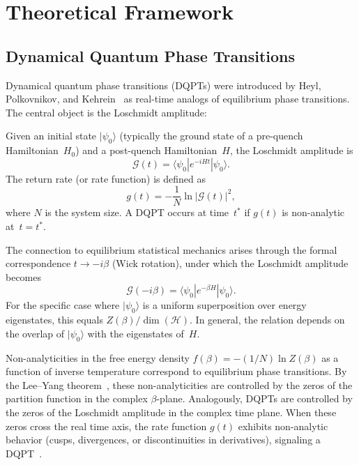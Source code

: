\section{Theoretical Framework}
\label{sec:theory}

\subsection{Dynamical Quantum Phase Transitions}
\label{sec:dqpt}

Dynamical quantum phase transitions (DQPTs) were introduced by Heyl, Polkovnikov, and
Kehrein~\cite{heyl2013} as real-time analogs of equilibrium phase transitions. The
central object is the Loschmidt amplitude:

\begin{definition}\label{def:loschmidt}
Given an initial state $|\psi_0\rangle$ (typically the ground state of a pre-quench
Hamiltonian~$H_0$) and a post-quench Hamiltonian~$H$, the Loschmidt amplitude is
\begin{equation}\label{eq:loschmidt}
  \mathcal{G}(t) = \langle\psi_0| e^{-iHt} |\psi_0\rangle.
\end{equation}
The return rate (or rate function) is defined as
\begin{equation}\label{eq:rate-general}
  g(t) = -\frac{1}{N}\ln|\mathcal{G}(t)|^2,
\end{equation}
where $N$ is the system size. A DQPT occurs at time~$t^*$ if $g(t)$ is non-analytic
at~$t = t^*$.
\end{definition}

The connection to equilibrium statistical mechanics arises through the formal
correspondence $t \to -i\beta$ (Wick rotation), under which the Loschmidt amplitude
becomes
\begin{equation}\label{eq:wick}
  \mathcal{G}(-i\beta) = \langle\psi_0| e^{-\beta H} |\psi_0\rangle.
\end{equation}
For the specific case where $|\psi_0\rangle$ is a uniform superposition over energy
eigenstates, this equals $Z(\beta)/\dim(\mathcal{H})$. In general, the relation depends
on the overlap of $|\psi_0\rangle$ with the eigenstates of~$H$.

Non-analyticities in the free energy density $f(\beta) = -(1/N)\ln Z(\beta)$ as a
function of inverse temperature correspond to equilibrium phase transitions. By the
Lee--Yang theorem~\cite{leeyang1952}, these non-analyticities are controlled by the
zeros of the partition function in the complex $\beta$-plane. Analogously, DQPTs are
controlled by the zeros of the Loschmidt amplitude in the complex time plane. When
these zeros cross the real time axis, the rate function $g(t)$ exhibits non-analytic
behavior (cusps, divergences, or discontinuities in derivatives), signaling a
DQPT~\cite{heyl2013}.

